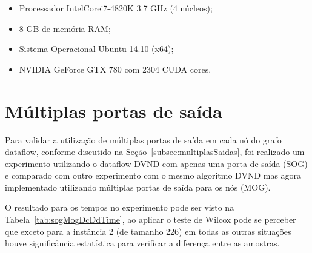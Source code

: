 \begin{itemize}
    \item Processador Intel\textregistered Core\texttrademark i7-4820K 3.7 GHz (4 núcleos);
    \item 8 GB de memória RAM;
    \item Sistema Operacional Ubuntu 14.10 (x64);
    \item NVIDIA GeForce GTX 780 com 2304 CUDA cores.
\end{itemize}



\section{Múltiplas portas de saída} \label{sec:resultadosMultiplasPortas}



Para validar a utilização de múltiplas portas de saída em cada nó do grafo dataflow, conforme discutido na Seção~\ref{subsec:multiplasSaidas}, foi realizado um experimento utilizando o dataflow DVND com apenas uma porta de saída (SOG) e comparado com outro experimento com o mesmo algoritmo DVND mas agora implementado utilizando múltiplas portas de saída para os nós (MOG).

O resultado para os tempos no experimento pode ser visto na Tabela~\ref{tab:sogMogDcDdTime}, ao aplicar o teste de Wilcox pode se perceber que exceto para a instância 2 (de tamanho 226) em todas as outras situações houve significância estatística para verificar a diferença entre as amostras.

